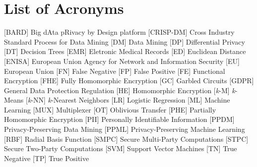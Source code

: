 %

\chapter*{List of Acronyms}
%
\begin{acronym}


 [BARD] {Big dAta pRivacy by Design platform}
 [CRISP-DM] {Cross Industry Standard Process for Data Mining}
 [DM] {Data Mining}
 [DP] {Differential Privacy}
 [DT] {Decision Trees}
 [EMR] {Eletronic Medical Records}
 [ED] {Euclidean Distance}
 [ENISA] {European Union Agency for Network and Information Security}
 [EU] {European Union}
 [FN] {False Negative}
 [FP] {False Positive}
 [FE] {Functional Encryption}
 [FHE] {Fully Homomorphic Encryption}
 [GC] {Garbled Circuits}
 [GDPR] {General Data Protection Regulation}
 [HE] {Homomorphic Encryption}
 [\textit{k}-M] {\textit{k}-Means}
 [\textit{k}-NN] {\textit{k}-Nearest Neighbors}
 [LR] {Logistic Regression}
 [ML] {Machine Learning}
 [MUX] {Multiplexer}
 [OT] {Oblivious Transfer}
 [PHE] {Partially Homomorphic Encryption}
 [PII] {Personally Identifiable Information}
 [PPDM] {Privacy-Preserving Data Mining}
 [PPML] {Privacy-Preserving Machine Learning}
 [RBF] {Radial Basis Function}
 [SMPC] {Secure Multi-Party Computations}
 [STPC] {Secure Two-Party Computations}
 [SVM] {Support Vector Machines}
 [TN] {True Negative}
 [TP] {True Positive}

\end{acronym}

\cleardoublepage

